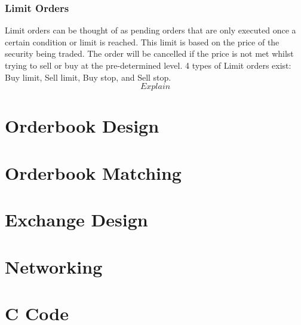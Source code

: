 \documentclass[12pt]{article}
\begin{document}
\subsubsection{Limit Orders}
Limit orders can be thought of as pending orders that are only executed once a 
certain condition or limit is reached. This limit is based on the price of the
security being traded. The order will be cancelled if the price is not met 
whilst trying to sell or buy at the pre-determined level. 4 types of Limit 
orders exist: Buy limit, Sell limit, Buy stop, and Sell stop. 
$${Explain}$$

\section{Orderbook Design}

\section{Orderbook Matching}

\section{Exchange Design}

\section{Networking}

\section{C Code}
\end{document}
